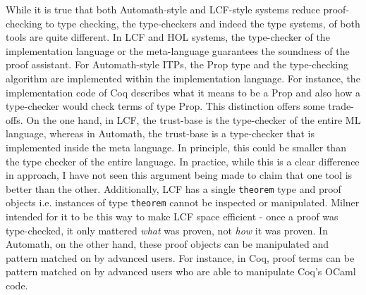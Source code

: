 \documentclass{article}
\begin{document}
  	While it is true that both 
  	Automath-style and LCF-style
  	systems reduce proof-checking
  	to type checking, the type-checkers 
  	and indeed the type systems, 
  	of both tools are quite different.
  	In LCF and HOL systems, the 
  	type-checker of the implementation 
  	language or the meta-language 
  	guarantees the soundness of the
  	proof assistant. For Automath-style
  	ITPs, the Prop type and the 
  	type-checking algorithm are 
  	implemented within the 
  	implementation language. For 
  	instance, the implementation 
  	code of Coq describes what it 
  	means to be a Prop and also 
  	how a type-checker would check 
  	terms of type Prop. This distinction
  	offers some trade-offs. On the one 
  	hand, in LCF, the trust-base is 
  	the type-checker of the entire
  	ML language, whereas in Automath, 
  	the trust-base is a type-checker
  	that is implemented inside the 
  	meta language. In principle, this 
  	could be smaller than the type
  	checker of the entire language.
  	In practice, while this is a 
  	clear difference in approach,
  	I have not seen this argument 
  	being made to claim that one tool 
  	is better than the other. 
  	Additionally, LCF has a single 
  	\texttt{theorem} type and proof
  	objects i.e. instances of type
  	\texttt{theorem} cannot be 
  	inspected or manipulated. Milner
  	intended for it to be this way
  	to make LCF space efficient - 
  	once a proof was type-checked, 
  	it only mattered \textit{what}
  	was proven, not \textit{how} it 
  	was proven. In Automath, on the 
  	other hand, these proof objects 
  	can be manipulated and pattern 
  	matched on by advanced users.
  	For instance, in Coq, proof terms 
  	can be pattern matched on by 
  	advanced users who are able to 
  	manipulate Coq's OCaml code.
  	
\end{document}
